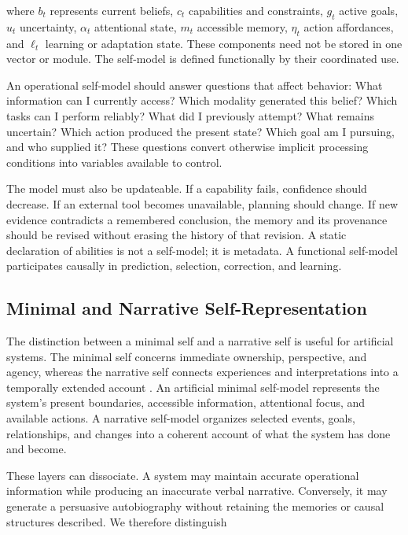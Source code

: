 where $b_t$ represents current beliefs, $c_t$ capabilities and constraints, $g_t$ active goals, $u_t$ uncertainty, $\alpha_t$ attentional state, $m_t$ accessible memory, $\eta_t$ action affordances, and $\ell_t$ learning or adaptation state. These components need not be stored in one vector or module. The self-model is defined functionally by their coordinated use.

An operational self-model should answer questions that affect behavior: What information can I currently access? Which modality generated this belief? Which tasks can I perform reliably? What did I previously attempt? What remains uncertain? Which action produced the present state? Which goal am I pursuing, and who supplied it? These questions convert otherwise implicit processing conditions into variables available to control.

The model must also be updateable. If a capability fails, confidence should decrease. If an external tool becomes unavailable, planning should change. If new evidence contradicts a remembered conclusion, the memory and its provenance should be revised without erasing the history of that revision. A static declaration of abilities is not a self-model; it is metadata. A functional self-model participates causally in prediction, selection, correction, and learning.

\subsection{Minimal and Narrative Self-Representation}
\label{subsec:minimal-narrative-self}

The distinction between a minimal self and a narrative self is useful for artificial systems. The minimal self concerns immediate ownership, perspective, and agency, whereas the narrative self connects experiences and interpretations into a temporally extended account \cite{gallagher2000self}. An artificial minimal self-model represents the system's present boundaries, accessible information, attentional focus, and available actions. A narrative self-model organizes selected events, goals, relationships, and changes into a coherent account of what the system has done and become.

These layers can dissociate. A system may maintain accurate operational information while producing an inaccurate verbal narrative. Conversely, it may generate a persuasive autobiography without retaining the memories or causal structures described. We therefore distinguish

